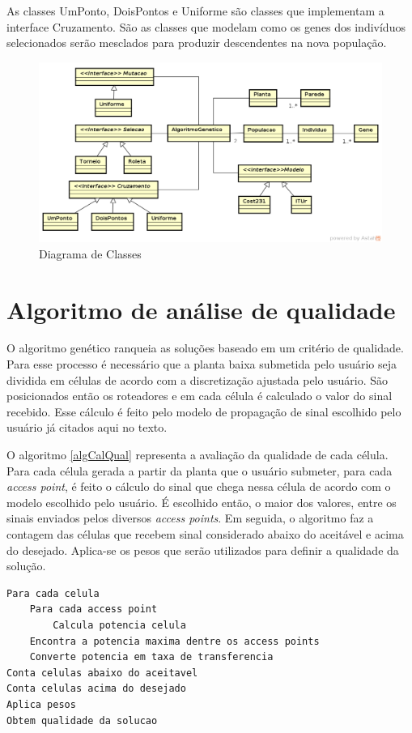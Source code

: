 \documentclass[tc,twoside]{iiufrgs}
\begin{document}
As classes UmPonto, DoisPontos e Uniforme são classes que implementam a interface Cruzamento. São as classes que modelam como os genes dos indivíduos selecionados serão mesclados para produzir descendentes na nova população. 

\begin{figure}[h]
\centering
\includegraphics[scale=0.5]{img/diagramaDeClasses.png}
\caption{Diagrama de Classes}
\label{fig:diagramaDeClasses}
\end{figure}

\section{Algoritmo de análise de qualidade}

O algoritmo genético ranqueia as soluções baseado em um critério de qualidade. Para esse processo é necessário que a planta baixa submetida pelo usuário seja dividida em células de acordo com a discretização ajustada pelo usuário. São posicionados então os roteadores e em cada célula é calculado o valor do sinal recebido. Esse cálculo é feito pelo modelo de propagação de sinal escolhido pelo usuário já citados aqui no texto. %
 
O algoritmo \ref{algCalQual} representa a avaliação da qualidade de cada célula. Para cada célula gerada a partir da planta que o usuário submeter, para cada \textit{access point}, é feito o cálculo do sinal que chega nessa célula de acordo com o modelo escolhido pelo usuário. É escolhido então, o maior dos valores, entre os sinais enviados pelos diversos \textit{access points}. Em seguida, o algoritmo faz a contagem das células que recebem sinal considerado abaixo do aceitável e acima do desejado. Aplica-se os pesos que serão utilizados para definir a qualidade da solução.     

\begin{lstlisting}[caption=Algoritmo cálculo da qualidade canônico, label=algCalQual]
Para cada celula
	Para cada access point
		Calcula potencia celula
	Encontra a potencia maxima dentre os access points
	Converte potencia em taxa de transferencia
Conta celulas abaixo do aceitavel
Conta celulas acima do desejado
Aplica pesos
Obtem qualidade da solucao
\end{lstlisting}
\end{document}
